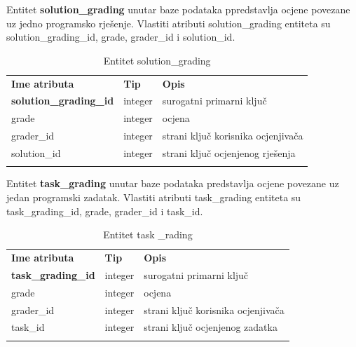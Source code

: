 \documentclass[times, utf8, zavrsni]{fer}
\begin{document}
		Entitet \textbf{solution\_grading} unutar baze podataka ppredstavlja ocjene povezane uz jedno programsko rješenje. Vlastiti atributi solution\_grading entiteta su solution\_grading\_id, grade, grader\_id i solution\_id. 
		\begin{table}[H]
			\caption{Entitet solution\_grading}
			\label{tbl:solutiongrading}
			\centering
			\begin{tabu} to \textwidth {XXX}
				\tabucline[1.75pt]{-}
				\textbf{Ime atributa} & \textbf{Tip} & \textbf{Opis}\\ 				
				\tabucline[1.75pt]{-}
				\textbf{solution\_grading\_id} & integer & surogatni primarni ključ\\ \hline
				grade & integer & ocjena\\ \hline
				grader\_id & integer & strani ključ korisnika ocjenjivača\\ \hline
				solution\_id & integer & strani ključ ocjenjenog rješenja\\ \hline
				\tabucline[1.75pt]{-}
			\end{tabu}
		\end{table}
	
		Entitet \textbf{task\_grading} unutar baze podataka predstavlja ocjene povezane uz jedan programski zadatak. Vlastiti atributi task\_grading entiteta su task\_grading\_id, grade, grader\_id i task\_id. 
		\begin{table}[H]
			\caption{Entitet task \_rading}
			\label{tbl:taskgrading}
			\centering
			\begin{tabu} to \textwidth {XXX}
				\tabucline[1.75pt]{-}
				\textbf{Ime atributa} & \textbf{Tip} & \textbf{Opis}\\ 				
				\tabucline[1.75pt]{-}
				\textbf{task\_grading\_id} & integer & surogatni primarni ključ\\ \hline
				grade & integer & ocjena\\ \hline
				grader\_id & integer & strani ključ korisnika ocjenjivača\\ \hline
				task\_id & integer & strani ključ ocjenjenog zadatka\\ \hline
				\tabucline[1.75pt]{-}
			\end{tabu}
		\end{table}
	
\end{document}
